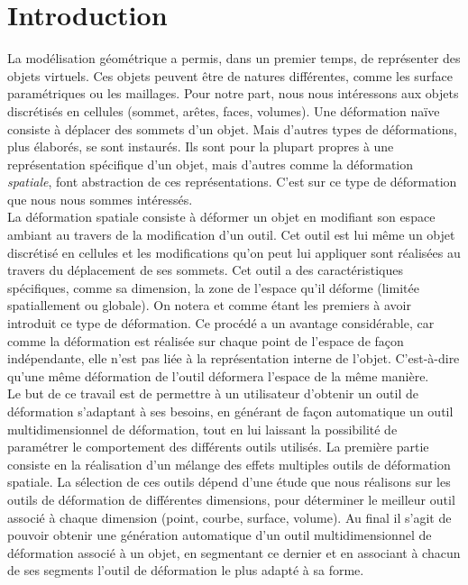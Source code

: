 \chapter{Introduction}

\graphicspath{ {Introduction/IntroductionFigs/PNG/}
  {Introduction/IntroductionFigs/PDF/}
  {Introduction/IntroductionFigs/} }

La modélisation géométrique a permis, dans un premier temps, de
représenter des objets virtuels. Ces objets peuvent être de natures
différentes, comme les surface paramétriques ou les maillages. Pour
notre part, nous nous intéressons aux objets discrétisés en cellules
(sommet, arêtes, faces, volumes). Une déformation naïve consiste à
déplacer des sommets d'un objet. Mais d'autres types de déformations,
plus élaborés, se sont instaurés. Ils sont pour la plupart propres à
une représentation spécifique d'un objet, mais d'autres comme la
déformation \textit{spatiale}, font abstraction de ces
représentations. C'est sur ce type de déformation que nous nous sommes
intéressés.
\\

La déformation spatiale consiste à déformer un objet en modifiant son
espace ambiant au travers de la modification d'un outil. Cet outil est
lui même un objet discrétisé en cellules et les modifications qu'on
peut lui appliquer sont réalisées au travers du déplacement de ses
sommets. Cet outil a des caractéristiques spécifiques, comme sa
dimension, la zone de l'espace qu'il déforme (limitée spatiallement ou
globale). On notera \cite{Bar84} et \cite{SP86} comme étant les
premiers à avoir introduit ce type de déformation. Ce procédé a un
avantage considérable, car comme la déformation est réalisée sur
chaque point de l'espace de façon indépendante, elle n'est pas liée à
la représentation interne de l'objet. C'est-à-dire qu'une même
déformation de l'outil déformera l'espace de la même manière.
\\

Le but de ce travail est de permettre à un utilisateur d'obtenir un
outil de déformation s'adaptant à ses besoins, en générant de façon
automatique un outil multidimensionnel de déformation, tout en lui
laissant la possibilité de paramétrer le comportement des différents
outils utilisés. La première partie consiste en la réalisation d'un
mélange des effets multiples outils de déformation spatiale. La
sélection de ces outils dépend d'une étude que nous réalisons sur les
outils de déformation de différentes dimensions, pour déterminer le
meilleur outil associé à chaque dimension (point, courbe, surface,
volume). Au final il s'agit de pouvoir obtenir une génération
automatique d'un outil multidimensionnel de déformation associé à un
objet, en segmentant ce dernier et en associant à chacun de ses
segments l'outil de déformation le plus adapté à sa forme.
\\


